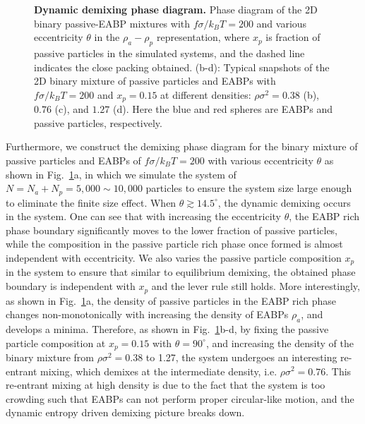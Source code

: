 \documentclass[prl, twocolumn, showpacs, preprintnumbers,amsmath,amssymb]{revtex4-1}
\begin{document}
\begin{figure}
\centering
\caption{\label{fig5} {\bf Dynamic demixing phase diagram.} Phase diagram of the 2D binary passive-EABP mixtures with $f\sigma/k_B T = 200$ and various eccentricity $\theta$ in the $\rho_a-\rho_p$ representation, where $x_p$ is fraction of passive particles in the simulated systems, and the dashed line indicates the close packing obtained.
(b-d): Typical snapshots of the 2D binary mixture of passive particles and EABPs with $f\sigma/k_B T = 200$ and $x_p = 0.15$ at different densities: $\rho \sigma^2=0.38$ (b), $0.76$ (c), and $1.27$ (d).
 Here the blue and red spheres are EABPs and passive particles, respectively.}
\end{figure}

Furthermore, we construct the demixing phase diagram for the binary mixture of passive particles and EABPs of $f \sigma /k_BT = 200$ with various eccentricity $\theta$ as shown in Fig.~\ref{fig5}a, in which we simulate the system of $N=N_a + N_p = 5,000 \sim 10,000$ particles to ensure the system size large enough to eliminate the finite size effect. When $\theta \gtrsim 14.5^{\circ}$, the dynamic demixing occurs in the system. One can see that with increasing the eccentricity $\theta$, the EABP rich phase boundary significantly moves to the lower fraction of passive particles, while the composition in the passive particle rich phase once formed is almost independent with eccentricity.
We also varies the passive particle composition $x_p$ in the system to ensure that similar to equilibrium demixing, the obtained phase boundary is independent with $x_p$ and the lever rule still holds. More interestingly, as shown in Fig.~\ref{fig5}a, the density of passive particles in the EABP rich phase changes non-monotonically with increasing the density of EABPs $\rho_a$, and develops a minima. Therefore, as shown in Fig.~\ref{fig5}b-d, by fixing the passive particle composition at $x_p = 0.15$ with $\theta = 90^{\circ}$, and increasing the density of the binary mixture from $\rho \sigma^2 = 0.38$ to 1.27, the system undergoes an interesting re-entrant mixing, which demixes at the intermediate density, i.e. $\rho \sigma^2 = 0.76$. 
This re-entrant mixing at high density is due to the fact that the system is too crowding such that EABPs can not perform proper circular-like motion, and the dynamic entropy driven demixing picture breaks down. 
\end{document}
